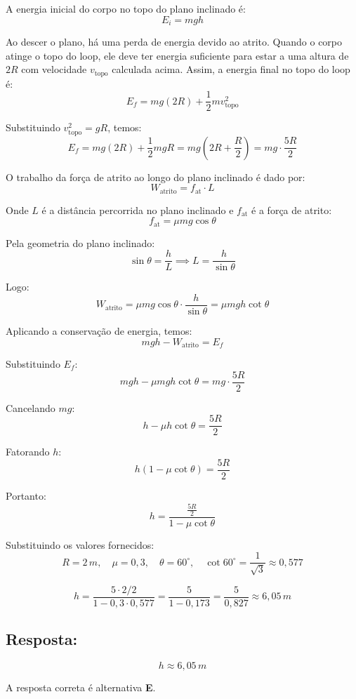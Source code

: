 \begin{flushleft}
A energia inicial do corpo no topo do plano inclinado é:
\[
E_i = m g h
\]

Ao descer o plano, há uma perda de energia devido ao atrito. Quando o corpo atinge o topo do loop, ele deve ter energia suficiente para estar a uma altura de $2R$ com velocidade $v_{\text{topo}}$ calculada acima. Assim, a energia final no topo do loop é:
\[
E_f = m g (2R) + \frac{1}{2} m v_{\text{topo}}^2
\]

Substituindo $v_{\text{topo}}^2 = gR$, temos:
\[
E_f = m g (2R) + \frac{1}{2} m g R = m g \left( 2R + \frac{R}{2} \right) = m g \cdot \frac{5R}{2}
\]

O trabalho da força de atrito ao longo do plano inclinado é dado por:
\[
W_{\text{atrito}} = f_{\text{at}} \cdot L
\]

Onde $L$ é a distância percorrida no plano inclinado e $f_{\text{at}}$ é a força de atrito:
\[
f_{\text{at}} = \mu m g \cos\theta
\]

Pela geometria do plano inclinado:
\[
\sin\theta = \frac{h}{L} \implies L = \frac{h}{\sin\theta}
\]

Logo:
\[
W_{\text{atrito}} = \mu m g \cos\theta \cdot \frac{h}{\sin\theta} = \mu m g h \cot\theta
\]

Aplicando a conservação de energia, temos:
\[
m g h - W_{\text{atrito}} = E_f
\]

Substituindo $E_f$:
\[
m g h - \mu m g h \cot\theta = m g \cdot \frac{5R}{2}
\]

Cancelando $m g$:
\[
h - \mu h \cot\theta = \frac{5R}{2}
\]

Fatorando $h$:
\[
h \left( 1 - \mu \cot\theta \right) = \frac{5R}{2}
\]

Portanto:
\[
h = \frac{\frac{5R}{2}}{1 - \mu \cot\theta}
\]

Substituindo os valores fornecidos:
\[
R = 2\,m, \quad \mu = 0{,}3, \quad \theta = 60^\circ, \quad \cot 60^\circ = \frac{1}{\sqrt{3}} \approx 0{,}577
\]

\[
h = \frac{5 \cdot 2 /2}{1 - 0{,}3 \cdot 0{,}577} = \frac{5}{1 - 0{,}173} = \frac{5}{0{,}827} \approx 6{,}05\,m
\]

\subsection*{Resposta:}

\[
\boxed{h \approx 6{,}05\,m}
\]

A resposta correta é alternativa \colorbox{green!50}{\textbf{E}}.

\end{flushleft}

